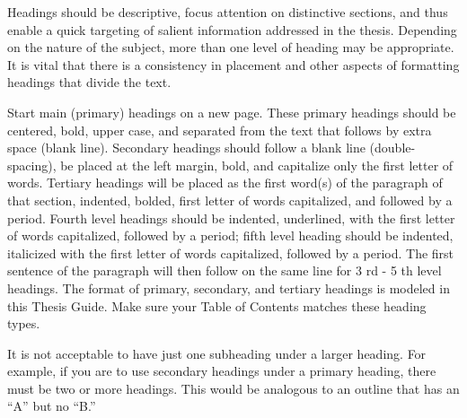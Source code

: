 Headings should be descriptive, focus attention on distinctive sections, and thus enable a quick targeting of salient information addressed in the thesis. Depending on the nature of the subject, more than one level of heading may be appropriate. It is vital that there is a consistency in placement and other aspects of formatting headings that divide the text.

Start main (primary) headings on a new page. These primary headings should be centered, bold, upper case, and separated from the text that follows by extra space (blank line). Secondary headings should follow a blank line (double-spacing), be placed at the left margin, bold, and capitalize only the first letter of words. Tertiary headings will be placed as the first word(s) of the paragraph of that section, indented, bolded, first letter of words capitalized, and followed by a period. Fourth level headings should be indented, underlined, with the first letter of words capitalized, followed by a period; fifth level heading should be indented, italicized with the first letter of words capitalized, followed by a period. The first sentence of the paragraph will then follow on the same line for 3 rd - 5 th level headings. The format of primary, secondary, and tertiary headings is modeled in this Thesis Guide. Make sure your Table of Contents matches these heading types.

It is not acceptable to have just one subheading under a larger heading. For example, if you are to use secondary headings under a primary heading, there must be two or more headings. This would be analogous to an outline that has an ``A'' but no ``B.''
